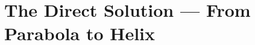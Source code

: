 \documentclass[12pt,a4paper]{report}
\theoremstyle{plain}
\theoremstyle{definition}
\theoremstyle{remark}
\begin{document}






\part{The Direct Solution --- From Parabola to Helix}
%
%




\end{document}
